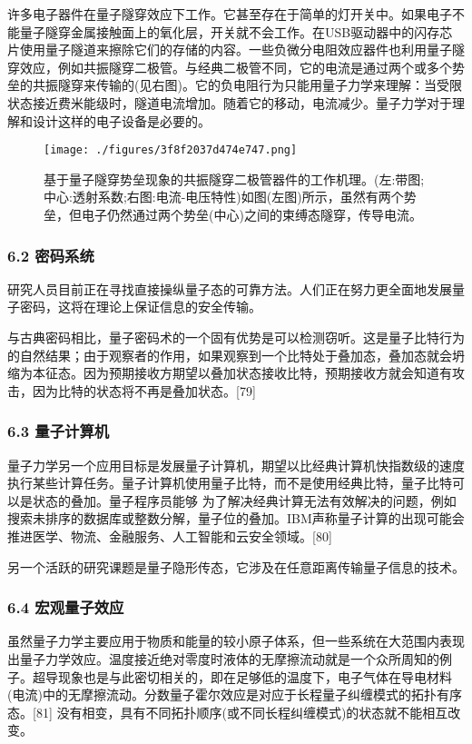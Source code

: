 许多电子器件在量子隧穿效应下工作。它甚至存在于简单的灯开关中。如果电子不能量子隧穿金属接触面上的氧化层，开关就不会工作。在USB驱动器中的闪存芯片使用量子隧道来擦除它们的存储的内容。一些负微分电阻效应器件也利用量子隧穿效应，例如共振隧穿二极管。与经典二极管不同，它的电流是通过两个或多个势垒的共振隧穿来传输的(见右图)。它的负电阻行为只能用量子力学来理解：当受限状态接近费米能级时，隧道电流增加。随着它的移动，电流减少。量子力学对于理解和设计这样的电子设备是必要的。
\begin{figure}[ht]
\centering
\texttt{[image: ./figures/3f8f2037d474e747.png]}
\caption{基于量子隧穿势垒现象的共振隧穿二极管器件的工作机理。(左:带图;中心:透射系数;右图:电流-电压特性)如图(左图)所示，虽然有两个势垒，但电子仍然通过两个势垒(中心)之间的束缚态隧穿，传导电流。} \label{fig_LZLX_5}
\end{figure}

\subsubsection{6.2 密码系统}
研究人员目前正在寻找直接操纵量子态的可靠方法。人们正在努力更全面地发展量子密码，这将在理论上保证信息的安全传输。

与古典密码相比，量子密码术的一个固有优势是可以检测窃听。这是量子比特行为的自然结果；由于观察者的作用，如果观察到一个比特处于叠加态，叠加态就会坍缩为本征态。因为预期接收方期望以叠加状态接收比特，预期接收方就会知道有攻击，因为比特的状态将不再是叠加状态。[79]

\subsubsection{6.3 量子计算机}
量子力学另一个应用目标是发展量子计算机，期望以比经典计算机快指数级的速度执行某些计算任务。量子计算机使用量子比特，而不是使用经典比特，量子比特可以是状态的叠加。量子程序员能够 为了解决经典计算无法有效解决的问题，例如搜索未排序的数据库或整数分解，量子位的叠加。IBM声称量子计算的出现可能会推进医学、物流、金融服务、人工智能和云安全领域。[80]

另一个活跃的研究课题是量子隐形传态，它涉及在任意距离传输量子信息的技术。

\subsubsection{6.4 宏观量子效应}
虽然量子力学主要应用于物质和能量的较小原子体系，但一些系统在大范围内表现出量子力学效应。温度接近绝对零度时液体的无摩擦流动就是一个众所周知的例子。超导现象也是与此密切相关的，即在足够低的温度下，电子气体在导电材料(电流)中的无摩擦流动。分数量子霍尔效应是对应于长程量子纠缠模式的拓扑有序态。[81] 没有相变，具有不同拓扑顺序(或不同长程纠缠模式)的状态就不能相互改变。

